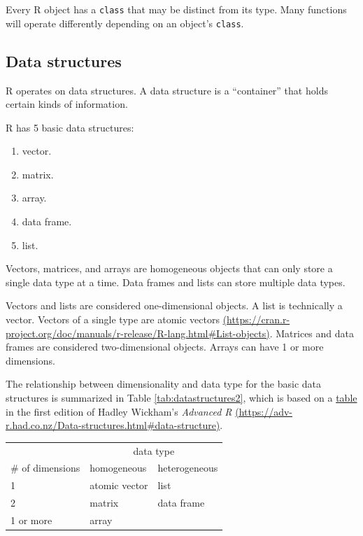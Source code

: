 \documentclass[
]{book}
\providecommand{\tightlist}{%
  \setlength{\itemsep}{0pt}\setlength{\parskip}{0pt}}
\theoremstyle{definition}
\theoremstyle{definition}
\theoremstyle{definition}
\theoremstyle{definition}
\theoremstyle{remark}
\begin{document}
Every R object has a \texttt{class} that may be distinct from its type. Many functions will operate differently depending on an object's \texttt{class}.

\hypertarget{data-structures}{%
\subsection{Data structures}\label{data-structures}}

R operates on data structures. A data structure is a ``container'' that holds certain kinds of information.

R has 5 basic data structures:

\begin{enumerate}
\def\labelenumi{\arabic{enumi}.}
\tightlist
\item
  vector.
\item
  matrix.
\item
  array.
\item
  data frame.
\item
  list.
\end{enumerate}

Vectors, matrices, and arrays are homogeneous objects that can only store a single data type at a time. Data frames and lists can store multiple data types.

Vectors and lists are considered one-dimensional objects. A list is technically a vector. Vectors of a single type are atomic vectors \href{https://cran.r-project.org/doc/manuals/r-release/R-lang.html\#List-objects}{(https://cran.r-project.org/doc/manuals/r-release/R-lang.html\#List-objects)}.
Matrices and data frames are considered two-dimensional objects. Arrays can have 1 or more dimensions.

The relationship between dimensionality and data type for the basic data structures is summarized in Table \ref{tab:datastructures2}, which is based on a \href{https://adv-r.had.co.nz/Data-structures.html\#data-structure}{table} in the first edition of Hadley Wickham's \emph{Advanced R} \href{https://adv-r.had.co.nz/Data-structures.html\#data-structure}{(https://adv-r.had.co.nz/Data-structures.html\#data-structure)}.

\begin{longtable}{l|ll}
\toprule
\multicolumn{1}{l}{} & \multicolumn{2}{c}{data type} \\ 
\cmidrule(lr){2-3}
\multicolumn{1}{l}{\# of dimensions} & homogeneous & heterogeneous \\ 
\midrule
1 & atomic vector & list \\ 
2 & matrix & data frame \\ 
1 or more & array &  \\ 
\bottomrule
\end{longtable}
\end{document}
